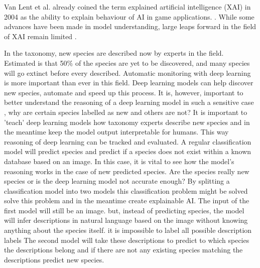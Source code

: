 \documentclass{article}
\begin{document}
Van Lent et al. already coined the term explained artificial intelligence (XAI) in 2004 as the ability to explain behaviour of AI in game applications. \cite{van_lent_explainable_2004}.
While some advances have been made in model understanding, large leaps forward in the field of XAI remain limited \cite{lipton_mythos_2017, li_interpretable_2021}.

In the taxonomy, new species are described now by experts in the field.
Estimated is that 50\% of the species are yet to be discovered, and many species will go extinct before every described.
Automatic monitoring with deep learning is more important than ever in this field.
Deep learning models can help discover new species, automate and speed up this process.
It is, however, important to better understand the reasoning of a deep learning model in such a sensitive case \cite{carvalho_machine_2019}, why are certain species labelled as new and others are not?
It is important to 'teach' deep learning models how taxonomy experts describe new species and in the meantime keep the model output interpretable for humans.
This way reasoning of deep learning can be tracked and evaluated.
A regular classification model will predict species and predict if a species does not exist within a known database based on an image.
In this case, it is vital to see how the model's reasoning works in the case of new predicted species.
Are the species really new species or is the deep learning model not accurate enough?
By splitting a classification model into two models this classification problem might be solved solve this problem and in the meantime create explainable AI.
The input of the first model will still be an image. 
but, instead of predicting species, the model will infer descriptions in natural language based on the image without knowing anything about the species itself.
it is impossible to label all possible description labels 
The second model will take these descriptions to predict to which species the descriptions belong and if there are not any existing species matching the descriptions predict new species.
\end{document}
